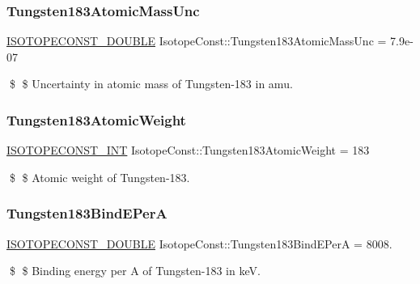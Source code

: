 \subsubsection{\texorpdfstring{Tungsten183\+Atomic\+Mass\+Unc}{Tungsten183AtomicMassUnc}}
{\footnotesize\ttfamily \mbox{\hyperlink{group___isotope_const-_macros_ga8f45a7272ce02c0b4c65c44636ed719a}{I\+S\+O\+T\+O\+P\+E\+C\+O\+N\+S\+T\+\_\+\+D\+O\+U\+B\+LE}} Isotope\+Const\+::\+Tungsten183\+Atomic\+Mass\+Unc = 7.\+9e-\/07}

\$ \$ Uncertainty in atomic mass of Tungsten-\/183 in amu. \mbox{\label{group___isotope_const-_tungsten-_w183_ga0f231d23a5cd70d5a9441215462ddc65}} 
\subsubsection{\texorpdfstring{Tungsten183\+Atomic\+Weight}{Tungsten183AtomicWeight}}
{\footnotesize\ttfamily \mbox{\hyperlink{group___isotope_const-_macros_ga5f18360b3e99483a35c32d789e62621c}{I\+S\+O\+T\+O\+P\+E\+C\+O\+N\+S\+T\+\_\+\+I\+NT}} Isotope\+Const\+::\+Tungsten183\+Atomic\+Weight = 183}

\$ \$ Atomic weight of Tungsten-\/183. \mbox{\label{group___isotope_const-_tungsten-_w183_ga10e2474950b1662cbba4175db3467811}} 
\subsubsection{\texorpdfstring{Tungsten183\+Bind\+E\+PerA}{Tungsten183BindEPerA}}
{\footnotesize\ttfamily \mbox{\hyperlink{group___isotope_const-_macros_ga8f45a7272ce02c0b4c65c44636ed719a}{I\+S\+O\+T\+O\+P\+E\+C\+O\+N\+S\+T\+\_\+\+D\+O\+U\+B\+LE}} Isotope\+Const\+::\+Tungsten183\+Bind\+E\+PerA = 8008.}

\$ \$ Binding energy per A of Tungsten-\/183 in keV. \mbox{\label{group___isotope_const-_tungsten-_w183_ga80416383f46b97e672c0b3d76e2d3276}} 
